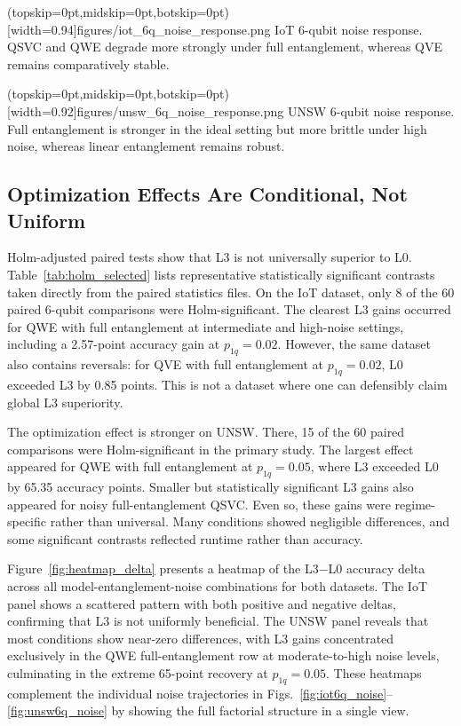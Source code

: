 \documentclass{ieeeaccess}
\begin{document}
\Figure[t!](topskip=0pt,midskip=0pt,botskip=0pt)[width=0.94\textwidth]{figures/iot_6q_noise_response.png}
{IoT 6-qubit noise response. QSVC and QWE degrade more strongly under full entanglement, whereas QVE remains comparatively stable.\label{fig:iot6q_noise}}

\Figure[t!](topskip=0pt,midskip=0pt,botskip=0pt)[width=0.92\textwidth]{figures/unsw_6q_noise_response.png}
{UNSW 6-qubit noise response. Full entanglement is stronger in the ideal setting but more brittle under high noise, whereas linear entanglement remains robust.\label{fig:unsw6q_noise}}

\subsection{Optimization Effects Are Conditional, Not Uniform}

Holm-adjusted paired tests show that L3 is not universally superior to L0. Table~\ref{tab:holm_selected} lists representative statistically significant contrasts taken directly from the paired statistics files. On the IoT dataset, only 8 of the 60 paired 6-qubit comparisons were Holm-significant. The clearest L3 gains occurred for QWE with full entanglement at intermediate and high-noise settings, including a 2.57-point accuracy gain at $p_{1q}=0.02$. However, the same dataset also contains reversals: for QVE with full entanglement at $p_{1q}=0.02$, L0 exceeded L3 by 0.85 points. This is not a dataset where one can defensibly claim global L3 superiority.

The optimization effect is stronger on UNSW. There, 15 of the 60 paired comparisons were Holm-significant in the primary study. The largest effect appeared for QWE with full entanglement at $p_{1q}=0.05$, where L3 exceeded L0 by 65.35 accuracy points. Smaller but statistically significant L3 gains also appeared for noisy full-entanglement QSVC. Even so, these gains were regime-specific rather than universal. Many conditions showed negligible differences, and some significant contrasts reflected runtime rather than accuracy.

Figure~\ref{fig:heatmap_delta} presents a heatmap of the L3$-$L0 accuracy delta across all model-entanglement-noise combinations for both datasets. The IoT panel shows a scattered pattern with both positive and negative deltas, confirming that L3 is not uniformly beneficial. The UNSW panel reveals that most conditions show near-zero differences, with L3 gains concentrated exclusively in the QWE full-entanglement row at moderate-to-high noise levels, culminating in the extreme 65-point recovery at $p_{1q}=0.05$. These heatmaps complement the individual noise trajectories in Figs.~\ref{fig:iot6q_noise}--\ref{fig:unsw6q_noise} by showing the full factorial structure in a single view.
\end{document}
